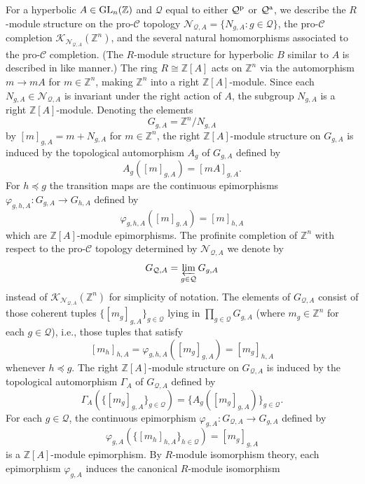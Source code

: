 \documentclass{amsart}
\theoremstyle{plain}
\theoremstyle{definition}
\theoremstyle{remark}
\begin{document}
For a hyperbolic $A\in {\rm GL}_n({\mathbb Z})$ and ${\mathcal Q}$ equal to either ${\mathcal Q}^{\rm p}$ or ${\mathcal Q}^{\rm a}$, we describe the $R$-module structure on the pro-${\mathcal C}$ topology ${\mathcal N}_{{\mathcal Q},A} = \{ N_{g,A} : g\in {\mathcal Q}\}$, the pro-${\mathcal C}$ completion ${\mathcal K}_{ {\mathcal N}_ {{\mathcal Q},A}}( {\mathbb Z}^n)$, and the several natural homomorphisms associated to the pro-${\mathcal C}$ completion. (The $R$-module structure for hyperbolic $B$ similar to $A$ is described in like manner.)  The ring $R\cong{\mathbb Z}[A]$ acts on ${\mathbb Z}^n$ via the automorphism $m\to mA$ for $m\in{\mathbb Z}^n$, making ${\mathbb Z}^n$ into a right ${\mathbb Z}[A]$-module. Since each $N_{g,A} \in {\mathcal N}_{ {\mathcal Q},A}$ is invariant under the right action of $A$, the subgroup $N_{g,A}$ is a right ${\mathbb Z}[A]$-module. Denoting the elements
\[ G_{g,A} = {\mathbb Z}^n/N_{g,A}\]
by $[m]_{g,A} = m + N_{g,A}$ for $m\in {\mathbb Z}^n$, the right ${\mathbb Z}[A]$-module structure on $G_{g,A}$ is induced by the topological automorphism $A_g$ of $G_{g,A}$ defined by
\[ A_g( [m]_{g,A}) = [mA]_{g,A}.\]
For $h\preceq g$ the transition maps are the continuous epimorphisms $\varphi_{g,h,A}:G_{g,A}\to G_{h,A}$ defined by
\[ \varphi_{g,h,A}([m]_{g,A}) = [m]_{h,A}\]
which are ${\mathbb Z}[A]$-module epimorphisms. The profinite completion of ${\mathbb Z}^n$ with respect to the pro-${\mathcal C}$ topology determined by ${\mathcal N}_{{\mathcal Q},A}$ we denote by
\[ G_{ {\mathcal Q},A} = \varprojlim_{g\in{\mathcal Q}} G_{g,A}\]
instead of ${\mathcal K}_{\mathcal N_{ {\mathcal Q},A}}({\mathbb Z}^n)$ for simplicity of notation.
The elements of $G_{ {\mathcal Q},A}$ consist of those coherent tuples $\{ [m_g]_{g,A}\}_{g\in{\mathcal Q}}$ lying in $\prod_{g\in{\mathcal Q}} G_{g,A}$ (where $m_g\in {\mathbb Z}^n$ for each $g\in {\mathcal Q}$), i.e., those tuples that satisfy
\[ [m_h]_{h,A} = \varphi_{g,h,A}( [m_g]_{g,A}) = [m_g]_{h,A}\]
whenever $h\preceq g$. The right ${\mathbb Z}[A]$-module structure on $G_{ {\mathcal Q},A}$ is induced by the topological automorphism $\Gamma_A$ of $G_{ {\mathcal Q},A}$ defined by
\[ \Gamma_A ( \{ [m_g]_{g,A}\}_{g\in{\mathcal Q}}) = \{ A_g ([m_g]_{g,A})\}_{g\in {\mathcal Q}}.\]
For each $g\in{\mathcal Q}$, the continuous epimorphism $\varphi_{g,A}:G_{ {\mathcal Q},A}\to G_{g,A}$ defined by
\[ \varphi_{g,A}( \{ [m_h]_{h,A}\}_{h\in{\mathcal Q}}) = [m_g]_{g,A}\]
is a ${\mathbb Z}[A]$-module epimorphism. By $R$-module isomorphism theory, each epimorphism $\varphi_{g,A}$ induces the canonical $R$-module isomorphism
\end{document}
